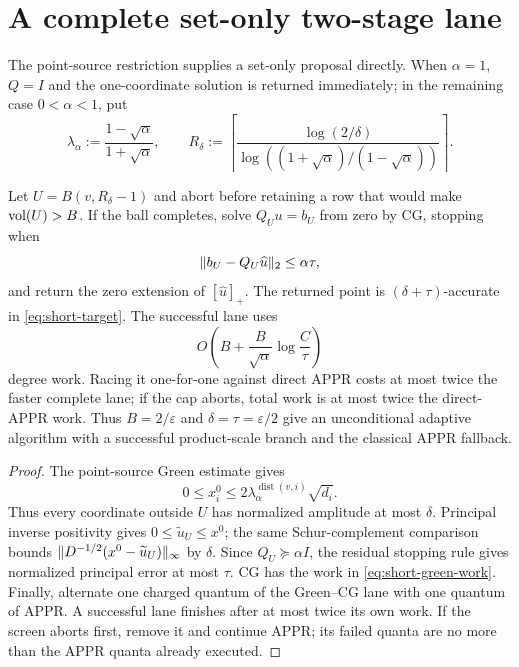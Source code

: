 \section{A complete set-only two-stage lane}

The point-source restriction supplies a set-only proposal directly.  When
$\alpha=1$, $Q=I$ and the one-coordinate solution is returned immediately;
in the remaining case $0<\alpha<1$, put
\begin{equation}
 \lambda_\alpha:=\frac{1-\sqrt\alpha}{1+\sqrt\alpha},
 \qquad
 R_\delta:=\left\lceil
  \frac{\log(2/\delta)}
       {\log((1+\sqrt\alpha)/(1-\sqrt\alpha))}
 \right\rceil .
 \label{eq:short-green-radius}
\end{equation}

\begin{theorem}
\label{thm:short-green-cg}
Let $U=B(v,R_\delta-1)$ and abort before retaining a row that would make
$\operatorname{vol}(U)>B$.  If the ball completes, solve $Q_Uu=b_U$ from zero by CG,
stopping when
\begin{equation*}
 \lVert b_U-Q_U\widehat u\rVert_2\leq\alpha\tau,
\end{equation*}
and return the zero extension of $[\widehat u]_+$.  The returned point is
$(\delta+\tau)$-accurate in \cref{eq:short-target}.  The successful lane uses
\begin{equation}
 O\!\left(B+\frac{B}{\sqrt\alpha}
       \log\frac{C}{\tau}\right)
 \label{eq:short-green-work}
\end{equation}
degree work.  Racing it one-for-one against direct APPR costs at most twice
the faster complete lane; if the cap aborts, total work is at most twice the
direct-APPR work.  Thus $B=2/\varepsilon$ and
$\delta=\tau=\varepsilon/2$ give an unconditional adaptive algorithm with a
successful product-scale branch and the classical APPR fallback.
\end{theorem}

\begin{proof}
The point-source Green estimate gives
\begin{equation*}
 0\leq x_i^0\leq
  2\lambda_\alpha^{\operatorname{dist}(v,i)}\sqrt{d_i}.
\end{equation*}
Thus every coordinate outside $U$ has normalized amplitude at most $\delta$.
Principal inverse positivity gives $0\leq\widetilde u_U\leq x^0$; the same
Schur-complement comparison bounds
$\lVert D^{-1/2}(x^0-\widetilde u_U)\rVert_\infty$ by $\delta$.
Since $Q_U\succeq\alpha I$, the residual stopping rule gives normalized
principal error at most $\tau$.  CG has the work in
\cref{eq:short-green-work}.  Finally, alternate one charged quantum of the
Green--CG lane with one quantum of APPR.  A successful lane finishes after at
most twice its own work.  If the screen aborts first, remove it and continue
APPR; its failed quanta are no more than the APPR quanta already executed.
\end{proof}

